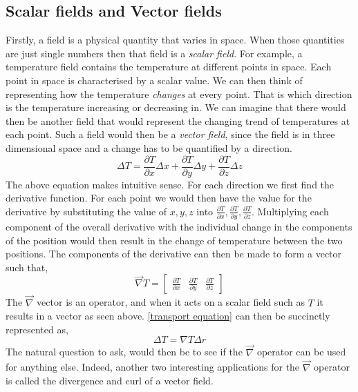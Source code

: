 \subsection{Scalar fields and Vector fields} 
Firstly, a field is a physical quantity that varies in space. When those quantities are just single numbers then that field is a \emph{scalar field}. For example, a temperature field contains the temperature at different points in space. Each point in space is characterised by a scalar value. We can then think of representing how the temperature \emph{changes} at every point. That is which direction is the temperature increasing or decreasing in. We can imagine that there would then be another field that would represent the changing trend of temperatures at each point. Such a field would then be a \emph{vector field}, since the field is in three dimensional space and a change has to be quantified by a direction.
\begin{equation}
	\label{transport equation}
	\Delta T = \frac{\partial T}{\partial x}\Delta x +  \frac{\partial T}{\partial y}\Delta y + \frac{\partial T}{\partial z}\Delta z
\end{equation}
The above equation makes intuitive sense. For each direction we first find the derivative function. For each point we would then have the value for the derivative by substituting the value of $x,y, z$ into $\frac{\partial T}{\partial x}, \frac{\partial T}{\partial y}, \frac{\partial T}{\partial z}$. Multiplying each component of the overall derivative with the individual change in the components of the position would then result in the change of temperature between the two positions. The components of the derivative can then be made to form a vector such that, 
\begin{equation}
	  \vec{\nabla}T = 
	  \begin{bmatrix} 
	  	\frac{\partial T}{\partial x} & \frac{\partial T}{\partial y} & \frac{\partial T}{\partial z}
	  \end{bmatrix}
\end{equation}
The $\vec{\nabla}$ vector is an operator, and when it acts on a scalar field such as $T$ it results in a vector as seen above. \autoref{transport equation} can then be succinctly represented as, 
\begin{equation}
	\Delta T = \nabla T \Delta r
\end{equation}
The natural question to ask, would then be to see if the $\vec{\nabla}$ operator can be used for anything else. Indeed, another two interesting applications for the $\vec{\nabla}$ operator is called the divergence and curl of a vector field.\\
